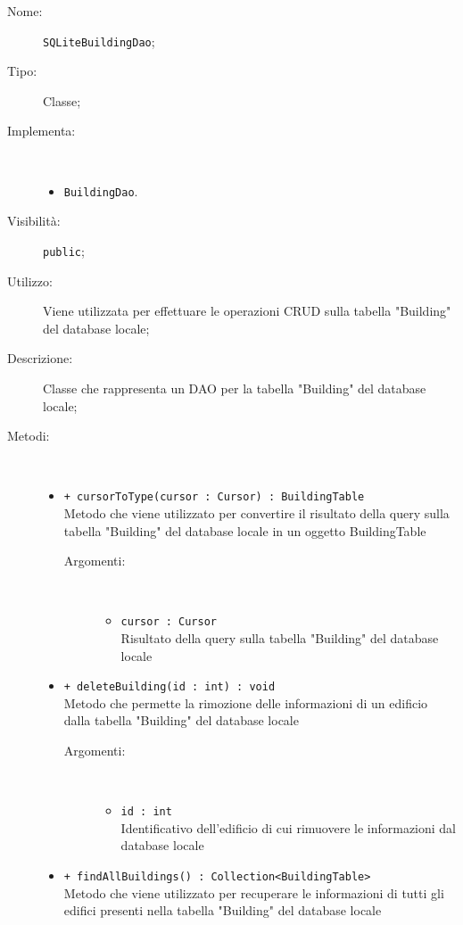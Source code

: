 \documentclass[../DefinizioneDiProdotto.tex]{subfiles}
\begin{document}
    \begin{description}
\item[Nome:] \texttt{SQLiteBuildingDao};
\item[Tipo:] Classe;
\item[Implementa:] \
\begin{itemize}
\item \texttt{BuildingDao}.

\end{itemize}
\item[Visibilità:] \texttt{public};
\item[Utilizzo:] Viene utilizzata per effettuare le operazioni CRUD sulla tabella "Building" del database locale;
\item[Descrizione:] Classe che rappresenta un DAO per la tabella "Building" del database locale;
\item[Metodi:] \
\begin{itemize}
\item \texttt{+ cursorToType(cursor : Cursor) : BuildingTable}\\
Metodo che viene utilizzato per convertire il risultato della query sulla tabella "Building" del database locale in un oggetto BuildingTable
 \begin{description}
\item[Argomenti:] \
\begin{itemize}
\item \texttt{cursor : Cursor}\\
Risultato della query sulla tabella "Building" del database locale\end{itemize}
\end{description}
\item \texttt{+ deleteBuilding(id : int) : void}\\
Metodo che permette la rimozione delle informazioni di un edificio dalla tabella "Building" del database locale 
 \begin{description}
\item[Argomenti:] \
\begin{itemize}
\item \texttt{id : int}\\
Identificativo dell'edificio di cui rimuovere le informazioni dal database locale\end{itemize}
\end{description}
\item \texttt{+ findAllBuildings() : Collection<BuildingTable>}\\
Metodo che viene utilizzato per recuperare le informazioni di tutti gli edifici presenti nella tabella "Building" del database locale

\end{itemize}
\end{description}
\end{document}
